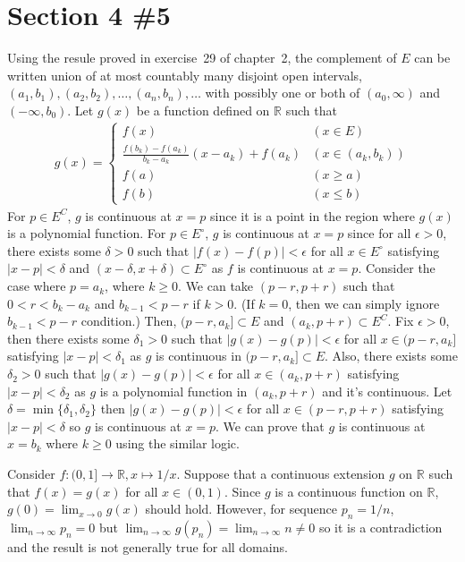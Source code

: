 \documentclass{scrartcl}
\begin{document}
\section{Section 4 \#5}
Using the resule proved in exercise~29 of chapter~2, the complement of \(E\) can be written union of at most countably many disjoint open intervals, \((a_1, b_1), (a_2, b_2), \dots, (a_n, b_n), \dots\) with possibly one or both of \((a_0, \infty)\) and \((-\infty, b_0)\).
Let \(g(x)\) be a function defined on \(\mathbb{R}\) such that
\begin{align*}
  g(x) = \begin{cases}
    f(x) & (x \in E) \\
    \frac{f(b_k) - f(a_k)}{b_k - a_k} (x - a_k) + f(a_k) & (x \in (a_k, b_k)) \\
    f(a) & (x \geq a) \\
    f(b) & (x \leq b)
  \end{cases}
\end{align*}
For \(p \in E^C\), \(g\) is continuous at \(x = p\) since it is a point in the region where \(g(x)\) is a polynomial function.
For \(p \in E^\circ\), \(g\) is continuous at \(x = p\) since for all \(\epsilon > 0\), there exists some \(\delta > 0\) such that \(|f(x) - f(p)| < \epsilon\) for all \(x \in E^\circ\) satisfying \(|x - p| < \delta\) and \((x - \delta, x + \delta) \subset E^\circ\) as \(f\) is continuous at \(x = p\).
Consider the case where \(p = a_k\), where \(k \geq 0\).
We can take \((p - r, p + r)\) such that \(0 < r < b_k - a_k\) and \(b_{k - 1} < p - r\) if \(k > 0\).
(If \(k = 0\), then we can simply ignore \(b_{k - 1} < p - r\) condition.)
Then, \((p - r, a_k] \subset E\) and \((a_k, p + r) \subset E^C\).
Fix \(\epsilon > 0\), then there exists some \(\delta_1 > 0\) such that \(|g(x) - g(p)| < \epsilon\) for all \(x \in (p - r, a_k]\) satisfying \(|x - p| < \delta_1\) as \(g\) is continuous in \((p - r, a_k] \subset E\).
Also, there exists some \(\delta_2 > 0\) such that \(|g(x) - g(p)| < \epsilon\) for all \(x \in (a_k, p + r)\) satisfying \(|x - p| < \delta_2\) as \(g\) is a polynomial function in \((a_k, p + r)\) and it's continuous.
Let \(\delta = \min \{\delta_1, \delta_2\}\) then \(|g(x) - g(p)| < \epsilon\) for all \(x \in (p - r, p + r)\) satisfying \(|x - p| < \delta\) so \(g\) is continuous at \(x = p\).
We can prove that \(g\) is continuous at \(x = b_k\) where \(k \geq 0\) using the similar logic.

Consider \(f : (0, 1] \to \mathbb{R}, x \mapsto 1 / x\).
Suppose that a continuous extension \(g\) on \(\mathbb{R}\) such that \(f(x) = g(x)\) for all \(x \in (0, 1)\).
Since \(g\) is a continuous function on \(\mathbb{R}\), \(g(0) = \lim_{x \to 0} g(x)\) should hold.
However, for sequence \(p_n = 1 / n\), \(\lim_{n \to \infty} p_n = 0\) but \(\lim_{n \to \infty} g(p_n) = \lim_{n \to \infty} n \not = 0\) so it is a contradiction and the result is not generally true for all domains.
\end{document}

